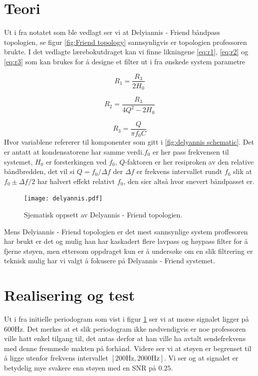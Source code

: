 \documentclass[a4paper,11pt,norsk]{article}
\begin{document}
\section{Teori}
\label{sec:teori}
Ut i fra notatet\cite{professor note} som ble vedlagt ser vi at Delyiannis - Friend båndpass topologien, se figur \ref{fig:Friend topology} sannsynligvis er topologien  professoren brukte. I det vedlagte lærebokutdraget \cite{book} kan vi finne likningene \eqref{eq:r1}, \eqref{eq:r2} og \eqref{eq:r3} som kan brukes for å designe et filter ut i fra ønskede system parametre

\begin{equation}
    \label{eq:r1}
    R_1=\frac{R_3}{2H_0}
\end{equation}

\begin{equation}
    \label{eq:r2}
    R_2=\frac{R_3}{4Q^2-2H_0}
\end{equation}

\begin{equation}
    \label{eq:r3}
    R_3=\frac{Q}{\pi f_0 C}
\end{equation}
Hvor variablene refererer til komponenter som gitt i \ref{fig:delyannis schematic}. Det er antatt at kondensatorene har samme verdi.$f_0$ er her pass frekvensen til systemet, $H_0$ er forsterkingen ved $f_0$,  $Q$-faktoren er her resiproken av den relative båndbredden, det vil si $Q=f_0/ \Delta f$ der $\Delta f$ er frekvens intervallet rundt $f_0$ slik at $f_0 \pm \Delta f /2$ har halvert effekt relativt $f_0$, den sier altså hvor snevert båndpasset er. 

\begin{figure}
\centering
	\texttt{[image: delyannis.pdf]}
	\caption{Sjematisk oppsett av Delyannis - Friend topologien. }
\centering
\label{fig:init_sp}
\end{figure}


Mens Delyiannis - Friend topologien er det mest sannsynlige system proffesoren har brukt er det og mulig han har kaskadert flere lavpass og høypass filter for å fjerne støyen, men ettersom oppdraget kun er å undersøke om en slik filtrering er teknisk mulig har vi valgt å fokusere på Delyannis - Friend systemet. 


\section{Realisering og test}


Ut i fra initielle periodogram som vist i figur \ref{fig:init_sp} ser vi at morse signalet ligger på $600\si{\hertz}$. Det merkes at et slik periodogram ikke nødvendigvis er noe professoren ville hatt enkel tilgang til, det antas derfor at han ville ha avtalt sendefrekvens med denne fremmede makten på forhånd. Videre ser vi at støyen er begrenset til å ligge utenfor frekvens intervallet $[200\si{\hertz}, 2000\si{\hertz}]$. Vi ser og at signalet er betydelig mye svakere enn støyen med en SNR på $0.25$. 
\end{document}
